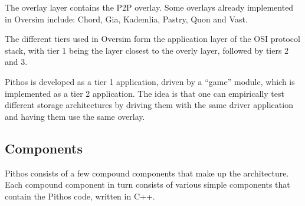 \documentclass[10pt,a4paper,conference]{IEEEtran}
\begin{document}
The overlay layer contains the P2P overlay. Some overlays already implemented in Oversim include: Chord, Gia, Kademlia, Pastry, Quon and Vast.

The different tiers used in Oversim form the application layer of the OSI protocol stack, with tier 1 being the layer closest to the overly layer,
followed by tiers 2 and 3.

Pithos is developed as a tier 1 application, driven by a ``game'' module, which is implemented as a tier 2 application. The idea is that one can
empirically test different storage architectures by driving them with the same driver application and having them use the same overlay.

\subsection{Components}

Pithos consists of a few compound components that make up the architecture. Each compound component in turn consists of various simple components
that contain the Pithos code, written in C++.
\end{document}
